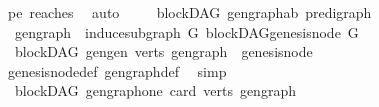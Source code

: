 \begin{isabellebody}
\ pe\ reaches\ \isamarkupfalse%
\ auto\isanewline
\ \ \isamarkupfalse%
\isanewline
{}\isamarkupfalse%
%
\endisatagproof
{\isafoldproof}%
%
\isadelimproof
%
\endisadelimproof
%
\isadelimdocument
%
\endisadelimdocument
%
\isatagdocument
%
\isamarkuptrue%
%
\endisatagdocument
{\isafolddocument}%
%
\isadelimdocument
%
\endisadelimdocument
{}\isamarkupfalse%
\ {\isacharparenleft}{\kern0pt}\ blockDAG{\isacharparenright}{\kern0pt}\ gen{\isacharunderscore}{\kern0pt}graph{\isacharcolon}{\kern0pt}{\isacharcolon}{\kern0pt}{\isachardoublequoteopen}{\isacharparenleft}{\kern0pt}{\isacharprime}{\kern0pt}a{\isacharcomma}{\kern0pt}{\isacharprime}{\kern0pt}b{\isacharparenright}{\kern0pt}\ pre{\isacharunderscore}{\kern0pt}digraph{\isachardoublequoteclose}\ \ \isanewline
\ \ {\isachardoublequoteopen}gen{\isacharunderscore}{\kern0pt}graph\ {\isacharequal}{\kern0pt}\ induce{\isacharunderscore}{\kern0pt}subgraph\ G\ {\isacharbraceleft}{\kern0pt}blockDAG{\isachardot}{\kern0pt}genesis{\isacharunderscore}{\kern0pt}node\ G{\isacharbraceright}{\kern0pt}{\isachardoublequoteclose}\isanewline
\isanewline
{}\isamarkupfalse%
\ {\isacharparenleft}{\kern0pt}\ blockDAG{\isacharparenright}{\kern0pt}\ gen{\isacharunderscore}{\kern0pt}gen\ {\isacharcolon}{\kern0pt}{\isachardoublequoteopen}verts\ {\isacharparenleft}{\kern0pt}gen{\isacharunderscore}{\kern0pt}graph{\isacharparenright}{\kern0pt}\ {\isacharequal}{\kern0pt}\ {\isacharbraceleft}{\kern0pt}genesis{\isacharunderscore}{\kern0pt}node{\isacharbraceright}{\kern0pt}{\isachardoublequoteclose}\ \isanewline
%
\isadelimproof
\ \ %
\endisadelimproof
%
\isatagproof
{}\isamarkupfalse%
\ genesis{\isacharunderscore}{\kern0pt}node{\isacharunderscore}{\kern0pt}def\ gen{\isacharunderscore}{\kern0pt}graph{\isacharunderscore}{\kern0pt}def\ \isamarkupfalse%
\ simp%
\endisatagproof
{\isafoldproof}%
%
\isadelimproof
\isanewline
%
\endisadelimproof
\isanewline
{}\isamarkupfalse%
\ {\isacharparenleft}{\kern0pt}\ blockDAG{\isacharparenright}{\kern0pt}\ gen{\isacharunderscore}{\kern0pt}graph{\isacharunderscore}{\kern0pt}one{\isacharcolon}{\kern0pt}\ {\isachardoublequoteopen}card\ {\isacharparenleft}{\kern0pt}verts\ gen{\isacharunderscore}{\kern0pt}graph{\isacharparenright}{\kern0pt}\ {\isacharequal}{\kern0pt}\ {}\ {\isachardoublequoteclose}%
\isadelimproof
\ %
\endisadelimproof
%
\isatagproof
{}\isamarkupfalse%

\end{isabellebody}
